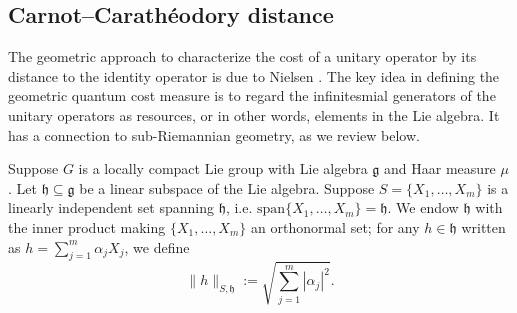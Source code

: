 \documentclass[11pt,reqno]{amsart}
\numberwithin{equation}{section}
\newcommand{\mc}{\mathcal}
\newcommand{\pl}{\hspace{.1cm}}
\begin{document}

\subsection{Carnot–Carath\'eodory distance}\label{sec:geometric}
The geometric approach to characterize the cost of a unitary operator by its distance to the identity operator is due to Nielsen \cite{N1,N2,N3}. The key idea in defining the geometric quantum cost measure is to regard the infinitesmial generators of the unitary operators as resources, or in other words, elements in the Lie algebra. It has a connection to sub-Riemannian geometry, as we review below. 
	
Suppose $G$ is a locally compact Lie group with Lie algebra $\mathfrak{g}$ and Haar measure $\mu$. Let $\mathfrak{h} \subseteq \mathfrak{g}$ be a linear subspace of the Lie algebra. Suppose $S = \{X_1,\dots,X_m\}$ is a linearly independent set spanning $\mathfrak{h}$, i.e. $\mathrm{span}\{X_1,\dots,X_m\} = \mathfrak{h}$. We endow $\mathfrak{h}$ with the inner product making $\{X_1,\dots,X_m\}$ an orthonormal set; for any $h \in \mathfrak{h}$ written as $h = \sum_{j=1}^m \alpha_j X_j$, we define
$$
\|h\|_{S,\mathfrak{h}} := \sqrt{\sum_{j=1}^m |\alpha_j|^2}.
$$
\end{document}
